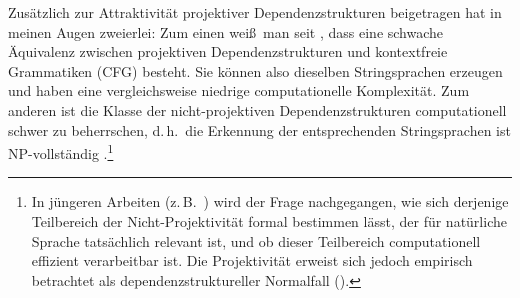 Zusätzlich zur Attraktivität projektiver Dependenzstrukturen beigetragen hat in meinen Augen zweierlei: Zum einen wei\ss\ man seit \cite{Gaifman:65}, dass eine schwache Äquivalenz zwischen projektiven Dependenzstrukturen und kontextfreie Grammatiken (CFG) besteht. Sie können also dieselben Stringsprachen erzeugen und haben eine vergleichsweise niedrige computationelle Komplexität. Zum anderen ist die Klasse der nicht-projektiven Dependenzstrukturen computationell schwer zu beherrschen, d.\,h.\ die Erkennung der entsprechenden Stringsprachen ist NP-vollständig \citep{Neuhaus:Broeker:97}.\footnote{In jüngeren Arbeiten (z.\,B.\ \citealt{Holan:etal:98,Dikovsky:Modina:00,Bodirsky:etal:05,Havelka:07,Maier:Lichte:11,Gomez:etal:11}) wird der Frage nachgegangen, wie sich derjenige Teilbereich der Nicht-Projektivität formal bestimmen lässt, der für natürliche Sprache tatsächlich relevant ist, und ob dieser Teilbereich computationell effizient verarbeitbar ist. Die Projektivität erweist sich jedoch empirisch betrachtet als dependenzstruktureller Normalfall (\citealt{Kuhlmann:Nivre:06,Maier:Lichte:11}).} %

